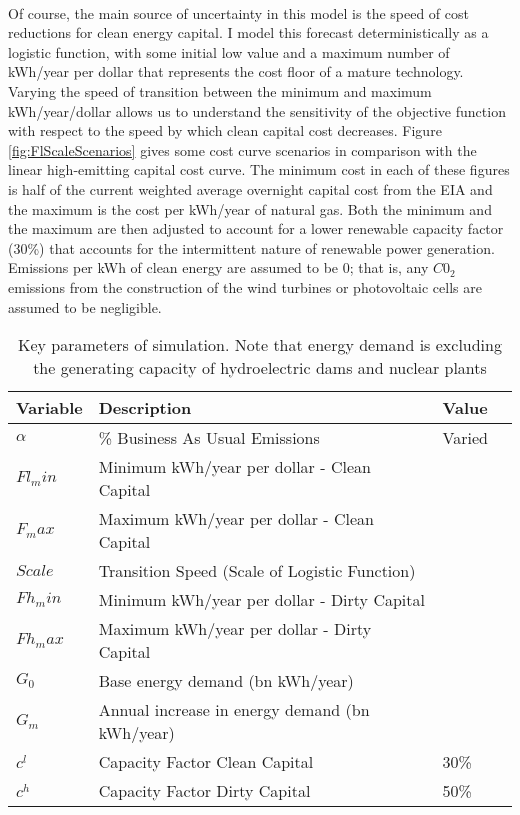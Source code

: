 \documentclass{easychithesis}
\begin{document}
\paragraph{} Of course, the main source of uncertainty in this model is the speed of cost reductions for clean energy capital. I model this forecast deterministically as a logistic function, with some initial low value and a maximum number of kWh/year per dollar that represents the cost floor of a mature technology. Varying the speed of transition between the minimum and maximum kWh/year/dollar allows us to understand the sensitivity of the objective function with respect to the speed by which clean capital cost decreases. Figure \ref{fig:FlScaleScenarios} gives some cost curve scenarios in comparison with the linear high-emitting capital cost curve. The minimum cost in each of these figures is half of the current weighted average overnight capital cost from the EIA and the maximum is the cost per kWh/year of natural gas. Both the minimum and the maximum are then adjusted to account for a lower renewable capacity factor (30\%) that accounts for the intermittent nature of renewable power generation. Emissions per kWh of clean energy are assumed to be 0; that is, any $C0_2$ emissions from the construction of the wind turbines or photovoltaic cells are assumed to be negligible. 


\begin{table}[h]\label{tab:ParamValues}
\begin{tabulary}{1.0\textwidth}{LLLL}
Variable & Description & Value\\
\hline
$\alpha$ &  \% Business As Usual Emissions  &  Varied \\
$Fl_min$ & Minimum kWh/year per dollar - Clean Capital & \\
$F_max$ & Maximum kWh/year per dollar - Clean Capital & \\
$Scale$ & Transition Speed  (Scale of Logistic Function) & \\
$Fh_min$ & Minimum kWh/year per dollar - Dirty Capital & \\
$Fh_max$ & Maximum kWh/year per dollar - Dirty Capital & \\
$G_0$ & Base energy demand (bn kWh/year) & \\
$G_m$ & Annual increase in energy demand (bn kWh/year) & \\
$c^l$ & Capacity Factor Clean Capital & 30\% \\
$c^h$ & Capacity Factor Dirty Capital & 50\% \\
\hline
\end{tabulary}
\caption{Key parameters of simulation. Note that energy demand is excluding the generating capacity of hydroelectric dams and nuclear plants}
\end{table}
\end{document}
